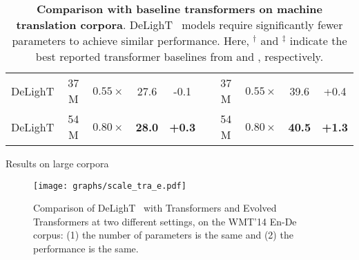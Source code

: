 \begin{table}[t!]
\begin{subtable}[b]{\columnwidth}
{\begin{tabular}{lcc||cc p{0.25cm} cc||cc}
            DeLighT                    & 37 M & $0.55\times$ & 27.6 & -0.1 && 37 M & $0.55\times$ & 39.6 & +0.4 \\
            DeLighT                    & 54 M & $0.80\times$ & \textbf{28.0} & \textbf{+0.3} && 54 M & $0.80\times$ & \textbf{40.5} & \textbf{+1.3} \\
            \bottomrule[1.5pt]
        \end{tabular}
    }
    \caption{Results on large corpora}
    \end{subtable}
    \caption{\textbf{Comparison with baseline transformers on machine translation corpora}. DeLighT ~models require significantly fewer parameters to achieve similar performance. Here, $^\dagger$ and $^\ddagger$ indicate the best reported transformer baselines from \citet{wu2018pay} and \citet{ghazvininejad2019mask}, respectively.}
    \label{tab:compare_delight_trans}
\end{table}
%
\begin{figure}[t!]
    \begin{minipage}[b]{0.46\columnwidth}
        \vspace{0pt}
        \centering
        \label{tab:results_depth_macs}
    \end{minipage}
    \hfill
    \begin{minipage}[b]{0.5\columnwidth}
        \vspace{0pt}
        \centering
        \texttt{[image: graphs/scale\_tra\_e.pdf]}
        \caption{Comparison of DeLighT ~with Transformers and Evolved Transformers at two different settings, on the WMT'14 En-De corpus: (1) the number of parameters is the same and (2) the performance is the same.}
        \label{fig:perf_compare_param}
    \end{minipage}
\end{figure}

